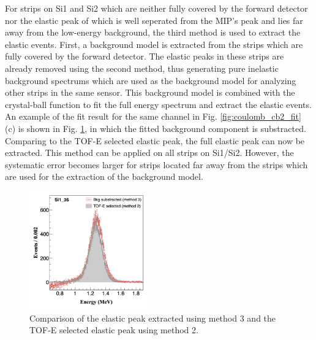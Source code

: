 \documentclass[fleqn,twocolumn,a4paper]{ikpar}
\begin{document}
\par
\medskip

For strips on Si1 and Si2 which are neither fully covered by the forward detector nor
the elastic peak of which is well seperated from the MIP's peak and lies
far away from the low-energy background, the third method is used to
extract the elastic events.
First, a background model is extracted from the strips which are fully covered by the forward detector.
The elastic peaks in these strips are already removed using the second method, thus generating 
pure inelastic background spectrums which are used as the background model
for analyzing other strips in the same sensor.
This background model is combined with the crystal-ball function to fit the full
energy spectrum and extract the elastic events.
An example of the fit result for the same channel in Fig. \ref{fig:coulomb_cb2_fit}
(c) is shown in Fig. \ref{fig:bkg_vs_tofe}, in which the fitted background component is substracted. 
Comparing to the TOF-E selected elastic peak, the full elastic peak can now be extracted.
This method can be applied on all strips on Si1/Si2.
However, the systematic error becomes larger for strips located far away from
the strips which are used for the extraction of the background model.
\begin{figure}[!htb]
	\includegraphics[width=0.45\textwidth]{./bkg_vs_tofe.png}
  \caption{Comparison of the elastic peak extracted using method 3 and the TOF-E
    selected elastic peak using method 2.}
  \label{fig:bkg_vs_tofe}
\end{figure}

\par
\medskip
\end{document}
